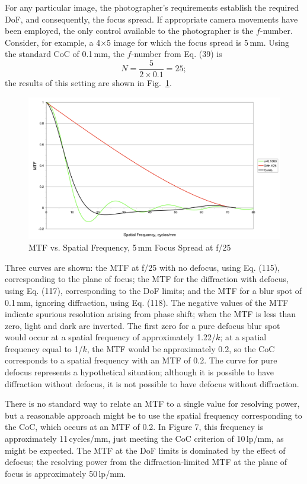 \documentclass[11pt, oneside]{scrartcl}   	%
\begin{document}
For any particular image, the photographer’s requirements establish the required DoF, and consequently, the focus spread. If appropriate camera movements have been employed, the only control available to the photographer is the $f$-number. Consider, for example, a 4×5 image for which the focus spread is 5\,mm. Using the standard CoC of 0.1\,mm, the $f$-number from Eq. (39) is
\begin{equation}
N = \frac5{2×0.1} = 25; 
\end{equation}
the results of this setting are shown in Fig.~\ref{fig:MTFvssf25}.
\begin{figure}[htbp] %
   \centering
   \includegraphics[width=\linewidth]{figure/fig_dofd_7} 
   \caption{MTF vs. Spatial Frequency, 5\,mm Focus Spread at f/25}
   \label{fig:MTFvssf25}
\end{figure}
Three curves are shown: the MTF at f/25 with no defocus, using Eq. (115), corresponding to the plane of focus; the MTF for the diffraction with defocus, using Eq. (117), corresponding to the DoF limits; and the MTF for a blur spot of 0.1\,mm, ignoring diffraction, using Eq. (118). The negative values of the MTF indicate spurious resolution arising from phase shift; when the MTF is less than zero, light and dark are inverted. The first zero for a pure defocus blur spot would occur at a spatial frequency of approximately 1.22/$k$; at a spatial frequency equal to 1/$k$, the MTF would be approximately 0.2, so the CoC corresponds to a spatial frequency with an MTF of 0.2. The curve for pure defocus represents a hypothetical situation; although it is possible to have diffraction without defocus, it is not possible to have defocus without diffraction.

There is no standard way to relate an MTF to a single value for resolving power, but a reasonable approach might be to use the spatial frequency corresponding to the CoC, which occurs at an MTF of 0.2. In Figure 7, this frequency is approximately 11\,cycles/mm, just meeting the CoC criterion of 10\,lp/mm, as might be expected. The MTF at the DoF limits is dominated by the effect of defocus; the resolving power from the diffraction-limited MTF at the plane of focus is approximately 50\,lp/mm.
\end{document}
